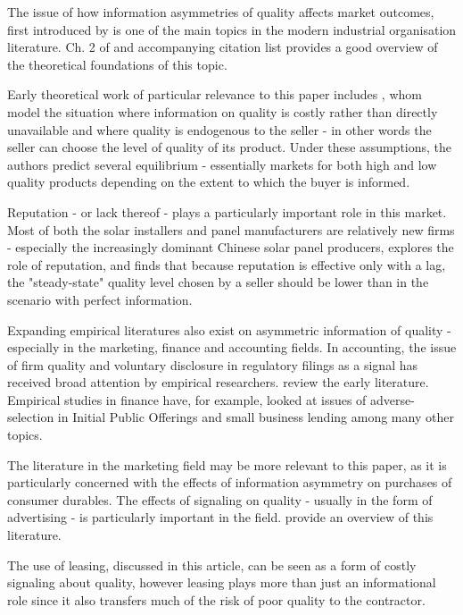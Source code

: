 \documentclass[12pt]{article}
\begin{document}
The issue of how information asymmetries of quality affects market outcomes, first introduced by \citet{akerlof_market_1970} is one of the main topics in the modern industrial organisation literature. Ch. 2 of \citet{tirole_theory_1988} and accompanying citation list provides a good overview of the theoretical foundations of this topic.

Early theoretical work of particular relevance to this paper includes \citet{chan_prices_1982}, whom model the situation where information on quality is costly rather than directly unavailable and where quality is endogenous to the seller - in other words the seller can choose the level of quality of its product. Under these assumptions, the authors predict several equilibrium - essentially markets for both high and low quality products depending on the extent to which the buyer is informed.

Reputation - or lack thereof - plays a particularly important role in this market. Most of both the solar installers and panel manufacturers are relatively new firms - especially the increasingly dominant Chinese solar panel producers,  \citet{shapiro_consumer_1982} explores the role of reputation, and finds that because reputation is effective only with a lag, the "steady-state" quality level chosen by a seller should be lower than in the scenario with perfect information.

Expanding empirical literatures also exist on asymmetric information of quality - especially in the marketing, finance and accounting fields. In accounting, the issue of firm quality and voluntary disclosure in regulatory filings as a signal has received broad attention by empirical researchers. \citet{healy_information_2001} review the early literature. Empirical studies in finance have, for example, looked at issues of adverse-selection in Initial Public Offerings \citep{michaely_pricing_1994} and small business lending \citep{petersen_benefits_1994} among many other topics.

The literature in the marketing field may be more relevant to this paper, as it is particularly concerned with the effects of information asymmetry on purchases of consumer durables. The effects of signaling on quality - usually in the form of advertising - is particularly important in the field. \citet{kirmani_no_2000} provide an overview of this literature.

The use of leasing, discussed in this article, can be seen as a form of costly signaling about quality, however leasing plays more than just an informational role since it also transfers much of the risk of poor quality to the contractor.
\end{document}
